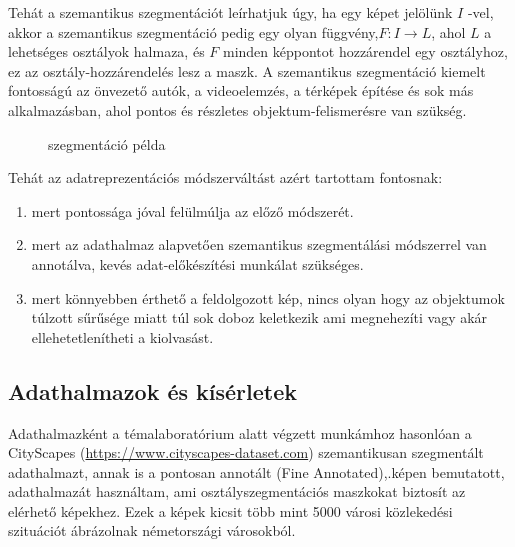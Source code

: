 \documentclass[12pt,oneside,a4paper]{article}
\theoremstyle{remark}
\begin{document}
Tehát a szemantikus szegmentációt leírhatjuk úgy, ha egy képet jelölünk \(I\) -vel, akkor a szemantikus
szegmentáció pedig egy olyan függvény,\(F: I \rightarrow L\), ahol \(L\) a lehetséges osztályok halmaza, és \(F\) minden
képpontot hozzárendel egy osztályhoz, ez az osztály-hozzárendelés lesz a maszk.
A szemantikus szegmentáció kiemelt fontosságú az önvezető autók, a
videoelemzés, a térképek építése és sok más
alkalmazásban, ahol pontos és részletes objektum-felismerésre van szükség.
\begin{figure}[ht]
    \centering
    \caption{szegmentáció példa}\label{fig:szegmentation example}
\end{figure}
Tehát az adatreprezentációs módszerváltást azért tartottam fontosnak:
\begin{enumerate}
    \item mert pontossága jóval felülmúlja az előző módszerét.
    \item mert az adathalmaz alapvetően szemantikus szegmentálási módszerrel van annotálva,
            kevés adat-előkészítési munkálat  szükséges.
    \item mert könnyebben érthető a feldolgozott kép, nincs olyan hogy az objektumok túlzott sűrűsége miatt túl sok
           doboz keletkezik ami megnehezíti vagy akár ellehetetlenítheti a kiolvasást.
\end{enumerate}


\subsection{Adathalmazok és kísérletek}\label{subsec:adathalmazok-es-kiserletek}
    Adathalmazként a témalaboratórium alatt végzett munkámhoz hasonlóan a CityScapes
    (\url{https://www.cityscapes-dataset.com}) szemantikusan szegmentált adathalmazt, annak is a pontosan annotált
    (Fine Annotated),\label{kephivatkozas}.képen bemutatott,
    adathalmazát használtam, ami osztályszegmentációs maszkokat biztosít az elérhető képekhez.
    Ezek a képek kicsit több mint 5000 városi közlekedési szituációt ábrázolnak
    németországi városokból.
\end{document}
